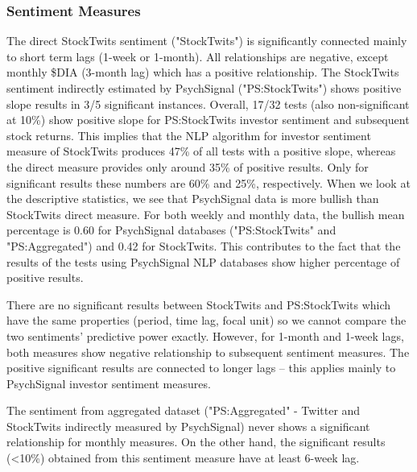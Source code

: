 \subsubsection{Sentiment Measures} \label{sentiment-measure-discussion}
The direct StockTwits sentiment ("StockTwits") is significantly connected mainly to short term lags (1-week or 1-month). All relationships are negative, except monthly \$DIA (3-month lag) which has a positive relationship. The StockTwits sentiment indirectly estimated by PsychSignal ("PS:StockTwits") shows positive slope results in 3/5 significant instances. Overall, 17/32 tests (also non-significant at 10\%) show positive slope for PS:StockTwits investor sentiment and subsequent stock returns. This implies that the NLP algorithm for investor sentiment measure of StockTwits produces 47\% of all tests with a positive slope, whereas the direct measure provides only around 35\% of positive results. Only for significant results these numbers are 60\% and 25\%, respectively. When we look at the descriptive statistics, we see that PsychSignal data is more bullish than StockTwits direct measure. For both weekly and monthly data, the bullish mean percentage is 0.60 for PsychSignal databases ("PS:StockTwits" and "PS:Aggregated") and 0.42 for StockTwits. This contributes to the fact that the results of the tests using PsychSignal NLP databases show higher percentage of positive results.
\par
There are no significant results between StockTwits and PS:StockTwits which have the same properties (period, time lag, focal unit) so we cannot compare the two sentiments’ predictive power exactly. However, for 1-month and 1-week lags, both measures show negative relationship to subsequent sentiment measures. The positive significant results are connected to longer lags – this applies mainly to PsychSignal investor sentiment measures.
\par
The sentiment from aggregated dataset ("PS:Aggregated" - Twitter and StockTwits indirectly measured by PsychSignal) never shows a significant relationship for monthly measures. On the other hand, the significant results (<10\%) obtained from this sentiment measure have at least 6-week lag.
\par

